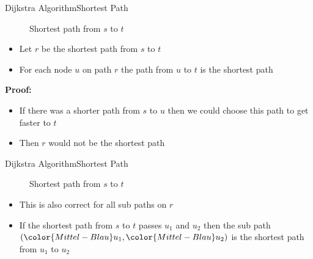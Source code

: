 \begin{frame}{Dijkstra Algorithm}{Shortest Path}
  \vspace{-1.5em}
  \begin{figure}
    \begin{adjustbox}{width=0.75\linewidth}
      
    \end{adjustbox}
    \label{fig:dijkstra:shortest_path_introduction}
    \caption{Shortest path from {\color{Mittel-Blau}$s$} to
    {\color{Mittel-Blau}$t$}}
  \end{figure}
  \vspace{-1.5em}
  \begin{itemize}
    \item
      Let {\color{Mittel-Gruen}$r$} be the shortest path from
      {\color{Mittel-Blau}$s$} to {\color{Mittel-Blau}$t$}
    \item
      For each node {\color{Mittel-Blau}$u$} on path {\color{Mittel-Gruen}$r$}
      the path from {\color{Mittel-Blau}$u$} to {\color{Mittel-Blau}$t$} is
      the shortest path
  \end{itemize}
  \textbf{Proof:}
  \begin{itemize}
    \item
      If there was a shorter path from {\color{Mittel-Blau}$s$} to
      {\color{Mittel-Blau}$u$} then we could choose this path to get faster to
      {\color{Mittel-Blau}$t$}
    \item
      Then {\color{Mittel-Gruen}$r$} would not be the shortest path
  \end{itemize}
\end{frame}


\begin{frame}{Dijkstra Algorithm}{Shortest Path}
  \vspace{-1.5em}
  \begin{figure}
    \begin{adjustbox}{width=0.75\linewidth}
      
    \end{adjustbox}
    \label{fig:dijkstra:shortest_path_introduction_re}
    \caption{Shortest path from {\color{Mittel-Blau}$s$} to
      {\color{Mittel-Blau}$t$}}
  \end{figure}
  \vspace{-1.5em}
  \begin{itemize}
    \item
      This is also correct for all sub paths on {\color{Mittel-Gruen}$r$}
    \item
      If the shortest path from {\color{Mittel-Blau}$s$} to
      {\color{Mittel-Blau}$t$} passes {\color{Mittel-Blau}$u_1$} and
      {\color{Mittel-Blau}$u_2$} then the sub path
      $({\color{Mittel-Blau}u_1}, {\color{Mittel-Blau}u_2})$
      is the shortest path from {\color{Mittel-Blau}$u_1$} to
      {\color{Mittel-Blau}$u_2$}
  \end{itemize}
\end{frame}

